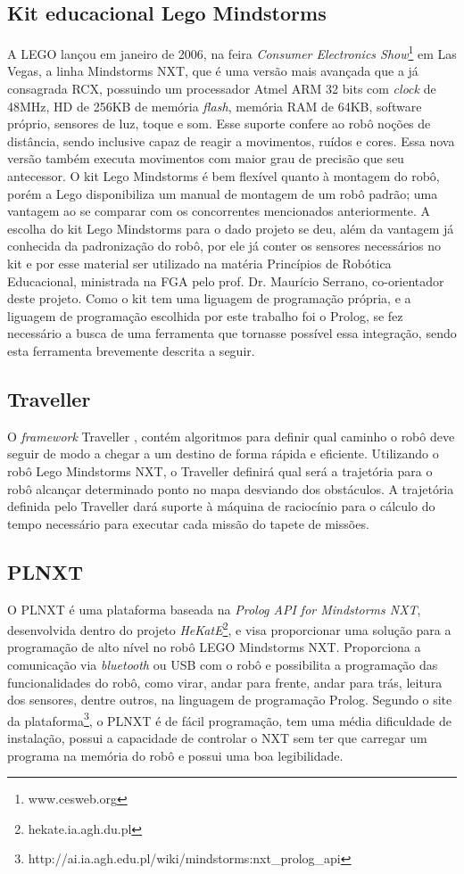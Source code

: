 \subsection{Kit educacional Lego Mindstorms}
A LEGO lançou em janeiro de 2006, na feira \textit{Consumer Electronics Show}\footnote{www.cesweb.org} em Las Vegas, a linha Mindstorms NXT, que é uma versão mais avançada que a já consagrada RCX, possuindo um processador Atmel ARM 32 bits com \textit{clock} de 48MHz, HD de 256KB de memória \textit{flash}, memória RAM de 64KB, software próprio, sensores de luz, toque e som. Esse suporte confere ao robô noções de distância, sendo inclusive capaz de reagir a movimentos, ruídos e cores. Essa nova versão também executa movimentos com maior grau de precisão que seu antecessor.
O kit Lego Mindstorms é bem flexível quanto à montagem do robô, porém a Lego disponibiliza um manual de montagem de um robô padrão; uma vantagem ao se comparar com os concorrentes mencionados anteriormente. 
A escolha do kit Lego Mindstorms para o dado projeto se deu, além da vantagem já conhecida da padronização do robô, por ele já conter os sensores necessários no kit e por esse material ser utilizado na matéria Princípios de Robótica Educacional, ministrada na FGA pelo prof. Dr. Maurício Serrano, co-orientador deste projeto. Como o kit tem uma liguagem de programação própria, e a liguagem de programação escolhida por este trabalho foi o Prolog, se fez necessário a busca de uma ferramenta que tornasse possível essa integração, sendo esta ferramenta brevemente descrita a seguir.  

\subsection{Traveller}
O \textit{framework} Traveller \cite{rinconframework}, contém algoritmos para definir qual caminho o robô deve seguir de modo a chegar a um destino de forma rápida e eficiente. Utilizando o robô Lego Mindstorms NXT, o Traveller definirá qual será a trajetória para o robô alcançar determinado ponto no mapa desviando dos obstáculos. A trajetória definida pelo Traveller dará suporte à máquina de raciocínio para o cálculo do tempo necessário para executar cada missão do tapete de missões.

\subsection{PLNXT}
O PLNXT é uma plataforma baseada na \textit{Prolog API for Mindstorms NXT}, desenvolvida dentro do projeto \textit{HeKatE}\footnote{hekate.ia.agh.du.pl}, e visa proporcionar uma solução para a programação de alto nível no robô LEGO Mindstorms NXT.
Proporciona a comunicação via \textit{bluetooth} ou USB com o robô e possibilita a programação das funcionalidades do robô, como virar, andar para frente, andar para trás, leitura dos sensores, dentre outros, na linguagem de programação Prolog.
Segundo o site da plataforma\footnote{http://ai.ia.agh.edu.pl/wiki/mindstorms:nxt\_prolog\_api}, o PLNXT é de fácil programação, tem uma média dificuldade de instalação, possui a capacidade de controlar o NXT sem ter que carregar um programa na memória do robô e possui uma boa legibilidade.

